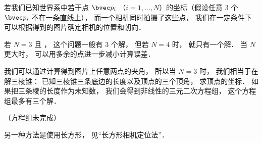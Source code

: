 

若我们已知世界系中若干点 $\bvec p_i$ （$i = 1, \dots, N$）的坐标（假设任意 3 个 $\bvec p_i$ 不在一条直线上）， 而一个相机同时拍摄了这些点， 我们在一定条件下可以根据得到的图片确定相机的位置和朝向．

若 $N = 3$ 且 ， 这个问题一般有 3 个解， 但若 $N = 4$ 时， 就只有一个解． 当 $N$ 更大时， 可以用多余的点进一步减小计算误差．

我们可以通过计算得到图片上任意两点的夹角， 所以当 $N = 3$ 时， 我们相当于在解三棱锥： 已知三棱锥三条底边的长度以及顶点的三个顶角， 求顶点的坐标． 如果把三条棱的长度作为未知数， 我们会得到非线性的三元二次方程组， 这个方程组最多有三个解．

（方程组未完成）

另一种方法是使用长方形， 见“长方形相机定位法”．
